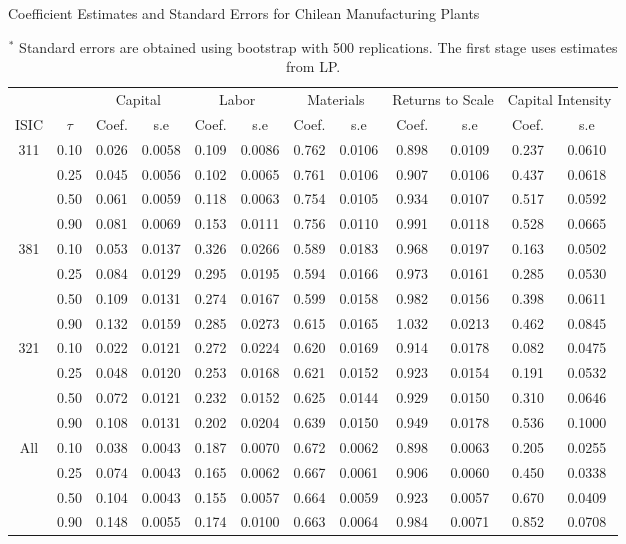 \documentclass[12pt]{article}
\begin{document}
\begin{appendices}
\begin{table}[H]
\centering
\caption{Coefficient Estimates and Standard Errors for Chilean Manufacturing Plants}
\small
\begin{tabular}{cccccccccccc}
  \hline\hline & & \multicolumn{2}{c}{Capital}  & \multicolumn{2}{c}{Labor} & \multicolumn{2}{c}{Materials} & \multicolumn{2}{c}{Returns to Scale} & \multicolumn{2}{c}{Capital Intensity}\\ \cmidrule(lr){3-4} \cmidrule(lr){5-6} \cmidrule(lr){7-8} \cmidrule(lr){9-10} \cmidrule(lr){11-12}ISIC & $\tau$ & Coef. & s.e & Coef. & s.e & Coef. & s.e & Coef. & s.e & Coef. & s.e \\ 
  \hline
311 & 0.10 & 0.026 & 0.0058 & 0.109 & 0.0086 & 0.762 & 0.0106 & 0.898 & 0.0109 & 0.237 & 0.0610 \\ 
   & 0.25 & 0.045 & 0.0056 & 0.102 & 0.0065 & 0.761 & 0.0106 & 0.907 & 0.0106 & 0.437 & 0.0618 \\ 
   & 0.50 & 0.061 & 0.0059 & 0.118 & 0.0063 & 0.754 & 0.0105 & 0.934 & 0.0107 & 0.517 & 0.0592 \\ 
   & 0.90 & 0.081 & 0.0069 & 0.153 & 0.0111 & 0.756 & 0.0110 & 0.991 & 0.0118 & 0.528 & 0.0665 \\ 
  381 & 0.10 & 0.053 & 0.0137 & 0.326 & 0.0266 & 0.589 & 0.0183 & 0.968 & 0.0197 & 0.163 & 0.0502 \\ 
   & 0.25 & 0.084 & 0.0129 & 0.295 & 0.0195 & 0.594 & 0.0166 & 0.973 & 0.0161 & 0.285 & 0.0530 \\ 
   & 0.50 & 0.109 & 0.0131 & 0.274 & 0.0167 & 0.599 & 0.0158 & 0.982 & 0.0156 & 0.398 & 0.0611 \\ 
   & 0.90 & 0.132 & 0.0159 & 0.285 & 0.0273 & 0.615 & 0.0165 & 1.032 & 0.0213 & 0.462 & 0.0845 \\ 
  321 & 0.10 & 0.022 & 0.0121 & 0.272 & 0.0224 & 0.620 & 0.0169 & 0.914 & 0.0178 & 0.082 & 0.0475 \\ 
   & 0.25 & 0.048 & 0.0120 & 0.253 & 0.0168 & 0.621 & 0.0152 & 0.923 & 0.0154 & 0.191 & 0.0532 \\ 
   & 0.50 & 0.072 & 0.0121 & 0.232 & 0.0152 & 0.625 & 0.0144 & 0.929 & 0.0150 & 0.310 & 0.0646 \\ 
   & 0.90 & 0.108 & 0.0131 & 0.202 & 0.0204 & 0.639 & 0.0150 & 0.949 & 0.0178 & 0.536 & 0.1000 \\ 
  All & 0.10 & 0.038 & 0.0043 & 0.187 & 0.0070 & 0.672 & 0.0062 & 0.898 & 0.0063 & 0.205 & 0.0255 \\ 
   & 0.25 & 0.074 & 0.0043 & 0.165 & 0.0062 & 0.667 & 0.0061 & 0.906 & 0.0060 & 0.450 & 0.0338 \\ 
   & 0.50 & 0.104 & 0.0043 & 0.155 & 0.0057 & 0.664 & 0.0059 & 0.923 & 0.0057 & 0.670 & 0.0409 \\ 
   & 0.90 & 0.148 & 0.0055 & 0.174 & 0.0100 & 0.663 & 0.0064 & 0.984 & 0.0071 & 0.852 & 0.0708 \\ 
   \hline
\end{tabular}
\caption*{\footnotesize $^{*}$ Standard errors are obtained using bootstrap with 500 replications. The first stage uses estimates from LP.}
\label{CHLQLP}
\end{table}


\end{appendices}
\end{document}
